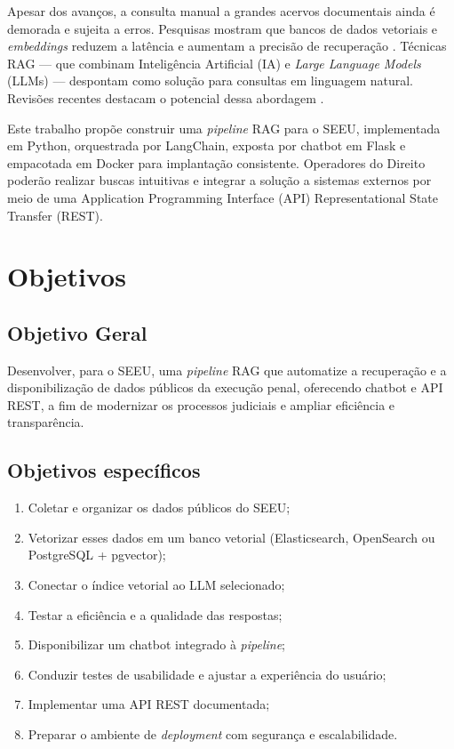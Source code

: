 Apesar dos avanços, a consulta manual a grandes acervos documentais ainda é
demorada e sujeita a erros. Pesquisas mostram que bancos de dados vetoriais e
\emph{embeddings} reduzem a latência e aumentam a precisão de recuperação
\cite{taipalus2024vector,gao2023survey}. Técnicas RAG — que combinam
Inteligência Artificial (IA) e \emph{Large Language Models} (LLMs) — despontam
como solução para consultas em linguagem natural. Revisões recentes destacam o
potencial dessa abordagem \cite{qwak2024integrating,pujiono2024implementing}.

Este trabalho propõe construir uma \emph{pipeline} RAG para o SEEU,
implementada em Python, orquestrada por LangChain, exposta por chatbot em Flask
e empacotada em Docker para implantação consistente. Operadores do Direito
poderão realizar buscas intuitivas e integrar a solução a sistemas externos por
meio de uma Application Programming Interface (API) Representational State Transfer (REST).





\section{Objetivos}
\label{sec:objetivos}

\subsection{Objetivo Geral}
Desenvolver, para o SEEU, uma \emph{pipeline} RAG que automatize a recuperação
e a disponibilização de dados públicos da execução penal, oferecendo chatbot e
API REST, a fim de modernizar os processos judiciais e ampliar eficiência e
transparência.

\subsection{Objetivos específicos}
\begin{enumerate}[label=\arabic*.]
  \item Coletar e organizar os dados públicos do SEEU;
  \item Vetorizar esses dados em um banco vetorial (Elasticsearch, OpenSearch
        ou PostgreSQL + pgvector);
  \item Conectar o índice vetorial ao LLM selecionado;
  \item Testar a eficiência e a qualidade das respostas;
  \item Disponibilizar um chatbot integrado à \emph{pipeline};
  \item Conduzir testes de usabilidade e ajustar a experiência do usuário;
  \item Implementar uma API REST documentada;
  \item Preparar o ambiente de \emph{deployment} com segurança e escalabilidade.
\end{enumerate}

